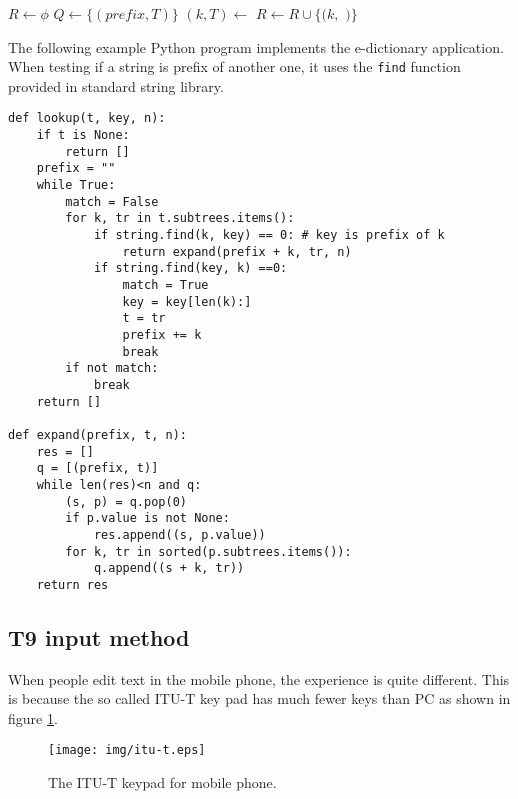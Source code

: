 \documentclass[b5paper]{article}
\begin{document}
\begin{algorithmic}[1]
  \State $R \gets \phi$
  \State $Q \gets \{(prefix, T)\}$
    \State $(k, T) \gets$ 
      \State $R \gets R \cup \{(k, $  $)\}$
    \EndIf
      \State {}
    \EndFor
  \EndWhile
\EndFunction
\end{algorithmic}

The following example Python program implements the e-dictionary application.
When testing if a string is prefix of another one, it uses the \texttt{find}
function provided in standard string library.

\lstset{language=Python}
\begin{lstlisting}
def lookup(t, key, n):
    if t is None:
        return []
    prefix = ""
    while True:
        match = False
        for k, tr in t.subtrees.items():
            if string.find(k, key) == 0: # key is prefix of k
                return expand(prefix + k, tr, n)
            if string.find(key, k) ==0:
                match = True
                key = key[len(k):]
                t = tr
                prefix += k
                break
        if not match:
            break
    return []

def expand(prefix, t, n):
    res = []
    q = [(prefix, t)]
    while len(res)<n and q:
        (s, p) = q.pop(0)
        if p.value is not None:
            res.append((s, p.value))
        for k, tr in sorted(p.subtrees.items()):
            q.append((s + k, tr))
    return res
\end{lstlisting}



\subsection{T9 input method}

When people edit text in the mobile phone, the experience is quite different.
This is because the so called ITU-T key pad has much fewer
keys than PC as shown in figure \ref{fig:itut-keypad}.

\begin{figure}[htbp]
  \centering
  \texttt{[image: img/itu-t.eps]}
  \caption{The ITU-T keypad for mobile phone.}
  \label{fig:itut-keypad}
\end{figure}
\end{document}
